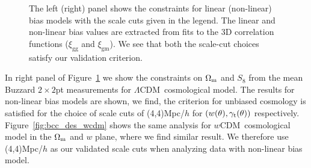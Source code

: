 \documentclass[aps, prd,twocolumn,superscriptaddress,nofootinbib,preprintnumbers]{revtex4-1}
\newcommand{\xigg}{\ensuremath{\xi_{\mathrm{gg}}} }
\newcommand{\xigm}{\ensuremath{\xi_{\mathrm{gm}}} }
\newcommand{\lcdm}{$\Lambda$CDM}
\newcommand{\wcdm}{$w$CDM}
\newcommand\fig[1]{Figure~\ref{#1}}
\newcommand{\IR}[1]{{\color{red}[\textbf{Note for IR}: #1]}}
\begin{document}
\begin{figure}
{%
The left (right) panel shows the constraints for linear (non-linear) bias models with the scale cuts given in the legend. The linear and non-linear bias values are extracted from fits to the 3D correlation functions ($\xigg$ and $\xigm$). We see that both the scale-cut choices satisfy our validation criterion. 
}
\label{fig:bcc_des_lcdm}
\end{figure}

In right panel of \fig{fig:bcc_des_lcdm} we show the constraints on $\Omega_{\rm m}$ and $S_8$ from the mean Buzzard $2\times2$pt measurements for \lcdm\ cosmological model. The results for non-linear bias models are shown, we find, the criterion for unbiased cosmology is satisfied for the choice of scale cuts of (4,4)Mpc/$h$ for $(w(\theta),\gamma_{\rm t}(\theta))$ respectively. \fig{fig:bcc_des_wcdm} shows the same analysis for \wcdm\ cosmological model in the $\Omega_{\rm m}$ and $w$ plane, where we find similar result. We therefore use (4,4)Mpc/$h$ as our validated scale cuts when analyzing data with non-linear bias model. 
\end{document}
